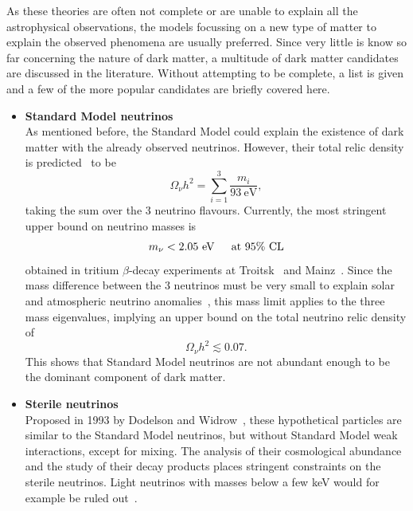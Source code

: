 As these theories are often not complete or are unable to explain all the astrophysical observations, the models focussing on a new type of matter to explain the observed phenomena are usually preferred. Since very little is know so far concerning the nature of dark matter, a multitude of dark matter candidates are discussed in the literature. Without attempting to be complete, a list is given and a few of the more popular candidates are briefly covered here.

\begin{itemize}
 \item[] \textbf{Standard Model neutrinos}\\
	As mentioned before, the Standard Model could explain the existence of dark matter with the already observed neutrinos. However, their total relic density is predicted~\cite{Bergstrom:2000pn} to be 
	\begin{equation}
	 \Omega_{\nu}h^2 = \sum_{i = 1}^3 \frac{m_i}{93\ \mathrm{eV}},
	\end{equation}
	taking the sum over the 3 neutrino flavours. Currently, the most stringent upper bound on neutrino masses is
	\begin{equation}
	 m_{\nu} < 2.05\ \text{eV \hspace{.3cm} at 95\% CL}
	\end{equation}
	obtained in tritium $\beta$-decay experiments at Troitsk~\cite{Lobashev:2003kt,Aseev:2011dq} and Mainz~\cite{Kraus:2004zw}. Since the mass difference between the 3 neutrinos must be very small to explain solar and atmospheric neutrino anomalies~\cite{GonzalezGarcia:2002dz}, this mass limit applies to the three mass eigenvalues, implying an upper bound on the total neutrino relic density of 
	\begin{equation}
	  \Omega_{\nu}h^2 \lesssim 0.07.
	\end{equation}
	This shows that Standard Model neutrinos are not abundant enough to be the dominant component of dark matter.
	
 \item[] \textbf{Sterile neutrinos}\\
         Proposed in 1993 by Dodelson and Widrow~\cite{Dodelson:1993je}, these hypothetical particles are similar to the Standard Model neutrinos, but without Standard Model weak interactions, except for mixing. The analysis of their cosmological abundance and the study of their decay products places stringent constraints on the sterile neutrinos. Light neutrinos with masses below a few keV would for example be ruled out~\cite{Yoshida:2003rm}.
         

\end{itemize}

